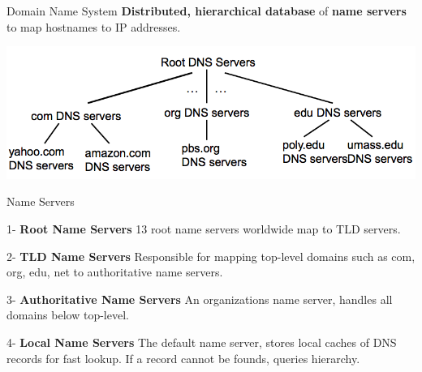 \begin{topic}{Domain Name System}
\textbf{Distributed, hierarchical database} of \textbf{name servers} to map hostnames to IP addresses.

\includegraphics[scale=0.35]{coms3200/images/dnslayout}
\end{topic}

\begin{topic}{Name Servers}

\begin{subtopic}{1-}
\textbf{Root Name Servers}
13 root name servers worldwide map to TLD servers.
\end{subtopic}

\begin{subtopic}{2-}
\textbf{TLD Name Servers}
Responsible for mapping top-level domains such as com, org, edu, net to authoritative name servers.
\end{subtopic}

\begin{subtopic}{3-}
\textbf{Authoritative Name Servers}
An organizations name server, handles all domains below top-level.
\end{subtopic}

\begin{subtopic}{4-}
\textbf{Local Name Servers}
The default name server, stores local caches of DNS records for fast lookup. If a record cannot be founds, queries hierarchy.
\end{subtopic}

\end{topic}


